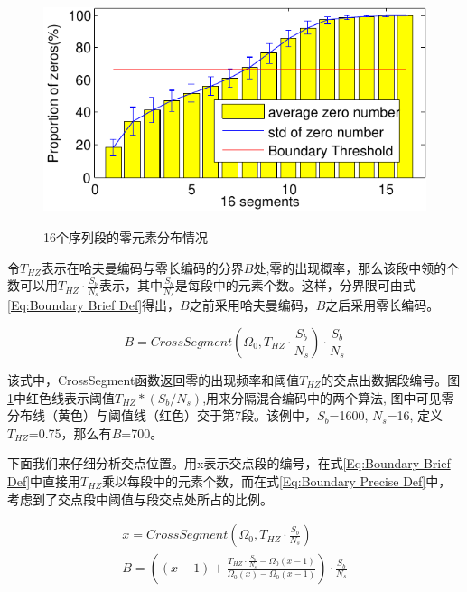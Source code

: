 \begin{figure}
  \centering
  \includegraphics{Pictures/Compression/f6-crop.pdf}\\
  \caption{16个序列段的零元素分布情况}\label{fig:Zero Distribution}
\end{figure}

令$T_{HZ}$表示在哈夫曼编码与零长编码的分界$B$处,零的出现概率，那么该段中领的个数可以用$T_{HZ}\cdot \frac{S_b}{N_s}$表示，其中$\frac{S_b}{N_s}$是每段中的元素个数。这样，分界限可由式\ref{Eq:Boundary Brief Def}得出，$B$之前采用哈夫曼编码，$B$之后采用零长编码。

\begin{equation}\label{Eq:Boundary Brief Def}
  B=CrossSegment\left(\Omega_0,T_{HZ}\cdot\frac{S_b}{N_s}\right)\cdot\frac{S_b}{N_s}
\end{equation}

该式中，CrossSegment函数返回零的出现频率和阈值$T_{HZ}$的交点出数据段编号。图\ref{fig:Zero Distribution}中红色线表示阈值$T_{HZ}*(S_b/N_s)$,用来分隔混合编码中的两个算法, 图中可见零分布线（黄色）与阈值线（红色）交于第7段。该例中，$S_b$=1600, $N_s$=16, 定义 $T_{HZ}$=0.75，那么有$B$=700。


下面我们来仔细分析交点位置。用x表示交点段的编号，在式\ref{Eq:Boundary Brief Def}中直接用$T_{HZ}$乘以每段中的元素个数，而在式\ref{Eq:Boundary Precise Def}中，考虑到了交点段中阈值与段交点处所占的比例。


\begin{equation}\label{Eq:Boundary Precise Def}
  \begin{array}{lr}
    x=CrossSegment\left(\Omega_0,T_{HZ}\cdot\frac{S_b}{N_s}\right)\\
    B=\left((x-1)+\frac{T_{HZ}\cdot \frac{S_b}{N_s}-\Omega_0(x-1)}{\Omega_0(x)-\Omega_0(x-1)}\right)\cdot \frac{S_b}{N_s}
  \end{array}
\end{equation}



